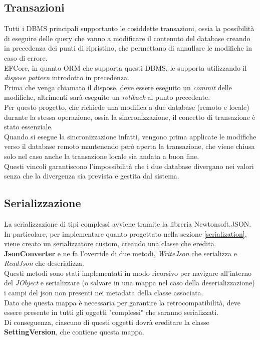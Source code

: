 \documentclass[\main/tesi.tex]{subfiles}
\begin{document}
\subsection{Transazioni}
\label{transazioni}

Tutti i DBMS principali supportanto le cosiddette transazioni, ossia la possibilità di eseguire delle query che vanno a modificare il contenuto del database creando in precedenza dei punti di ripristino, che permettano di annullare le modifiche in caso di errore.\\
EFCore, in quanto ORM che supporta questi DBMS, le supporta utilizzando il \textit{dispose pattern} introdotto in precedenza.\\
Prima che venga chiamato il dispose, deve essere eseguito un \textit{commit} delle modifiche, altrimenti sarà eseguito un \textit{rollback} al punto precedente.\\
Per questo progetto, che richiede una modifica a due database (remoto e locale) durante la stessa operazione, ossia la sincronizzazione, il concetto di transazione è stato essenziale.\\
Quando si esegue la sincronizzazione infatti, vengono prima applicate le modifiche verso il database remoto mantenendo però aperta la transazione, che viene chiusa solo nel caso anche la transazione locale sia andata a buon fine.\\
Questi vincoli garantiscono l'impossibilità che i due database divergano nei valori senza che la divergenza sia prevista e gestita dal sistema.

\subsection{Serializzazione}
\label{serializationimplementation}
La serializzazione di tipi complessi avviene tramite la libreria Newtonsoft.JSON.\\
In particolare, per implementare quanto progettato nella sezione \ref{serialization}, viene creato un serializzatore custom, creando una classe che eredita \textbf{JsonConverter} e ne fa l'override di due metodi, \textit{WriteJson} che serializza e \textit{ReadJson} che deserializza.\\
Questi metodi sono stati implementati in modo ricorsivo per navigare all'interno del \textit{JObject} e serializzare (o salvare in una mappa nel caso della deserializzazione) i campi del json non presenti nei metadata della classe associata.\\
Dato che questa mappa è necessaria per garantire la retrocompatibilità, deve essere presente in tutti gli oggetti "complessi" che saranno serializzati.\\
Di conseguenza, ciascuno di questi oggetti dovrà ereditare la classe \textbf{SettingVersion}, che contiene questa mappa.
\end{document}
